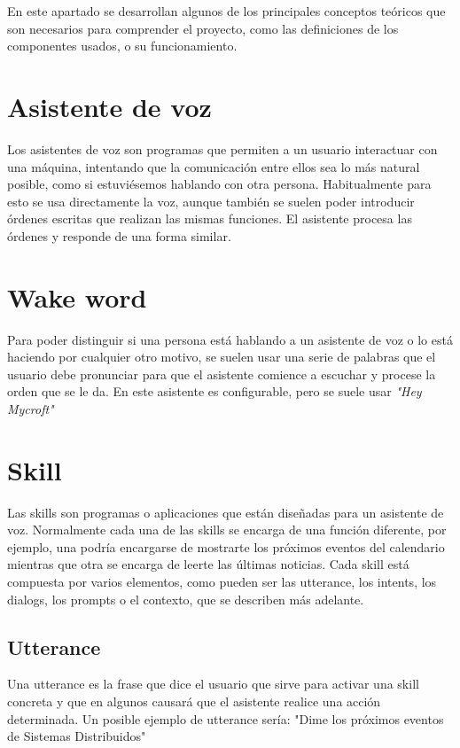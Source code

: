 
En este apartado se desarrollan algunos de los principales conceptos teóricos que son necesarios para comprender el proyecto, como las definiciones de los componentes usados, o su funcionamiento.

\section{Asistente de voz}
Los asistentes de voz son programas que permiten a un usuario interactuar con una máquina, intentando que la comunicación entre ellos sea lo más natural posible, como si estuviésemos hablando con otra persona. Habitualmente para esto se usa directamente la voz, aunque también se suelen poder introducir órdenes escritas que realizan las mismas funciones. El asistente procesa las órdenes y responde de una forma similar.

\section{Wake word}
Para poder distinguir si una persona está hablando a un asistente de voz o lo está haciendo por cualquier otro motivo, se suelen usar una serie de palabras que el usuario debe pronunciar para que el asistente comience a escuchar y procese la orden que se le da. En este asistente es configurable, pero se suele usar \textit{"Hey Mycroft"}

\section{Skill}
Las skills son programas o aplicaciones que están diseñadas para un asistente de voz. Normalmente cada una de las skills se encarga de una función diferente, por ejemplo, una podría encargarse de mostrarte los próximos eventos del calendario mientras que otra se encarga de leerte las últimas noticias. Cada skill está compuesta por varios elementos, como pueden ser las utterance, los intents, los dialogs, los prompts o el contexto, que se describen más adelante.

\subsection{Utterance}
Una utterance es la frase que dice el usuario que sirve para activar una skill concreta y que en algunos causará que el asistente realice una acción determinada. Un posible ejemplo de utterance sería: "Dime los próximos eventos de Sistemas Distribuidos"

